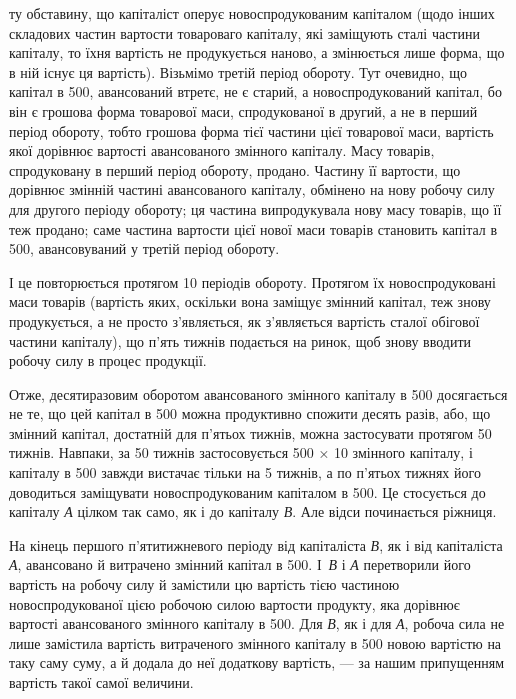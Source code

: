 \parcont{}  %
ту обставину, що капіталіст оперує новоспродукованим капіталом (щодо
інших складових частин вартости товароваго капіталу, які заміщують
сталі частини капіталу, то їхня вартість не продукується наново, а змінюється
лише форма, що в ній існує ця вартість). Візьмімо третій період
обороту. Тут очевидно, що капітал в 500, авансований втретє,
не є старий, а новоспродукований капітал, бо він є грошова форма
товарової маси, спродукованої в другий, а не в перший період обороту,
тобто грошова форма тієї частини цієї товарової маси, вартість якої
дорівнює вартості авансованого змінного капіталу. Масу товарів, спродуковану
в перший період обороту, продано. Частину її вартости, що дорівнює
змінній частині авансованого капіталу, обмінено на нову робочу
силу для другого періоду обороту; ця частина випродукувала нову масу
товарів, що її теж продано; саме частина вартости цієї нової маси
товарів становить капітал в 500, авансовуваний у третій період
обороту.

І це повторюється протягом 10 періодів обороту. Протягом їх новоспродуковані
маси товарів (вартість яких, оскільки вона заміщує змінний
капітал, теж знову продукується, а не просто з’являється, як з’являється
вартість сталої обігової частини капіталу), що п’ять тижнів подається
на ринок, щоб знову вводити робочу силу в процес продукції.

Отже, десятиразовим оборотом авансованого змінного капіталу в 500 досягається не те, що цей капітал в 500 можна продуктивно
спожити десять разів, або, що змінний капітал, достатній для
п’ятьох тижнів, можна застосувати протягом 50 тижнів. Навпаки, за 50
тижнів застосовується 500 × 10 змінного капіталу, і капіталу в
500 завжди вистачає тільки на 5 тижнів, а по п’ятьох тижнях
його доводиться заміщувати новоспродукованим капіталом в 500.
Це стосується до капіталу \emph{А} цілком так само, як і до капіталу \emph{В}. Але
відси починається ріжниця.

На кінець першого п’ятитижневого періоду від капіталіста \emph{В}, як і
від капіталіста \emph{А}, авансовано й витрачено змінний капітал в 500.
І~\emph{В} і \emph{А} перетворили його вартість на робочу силу й замістили цю вартість
тією частиною новоспродукованої цією робочою силою вартости продукту,
яка дорівнює вартості авансованого змінного капіталу в 500. Для
\emph{В}, як і для \emph{А}, робоча сила не лише замістила вартість витраченого змінного
капіталу в 500 новою вартістю на таку саму суму, а й додала
до неї додаткову вартість, — за нашим припущенням вартість такої
самої величини.

